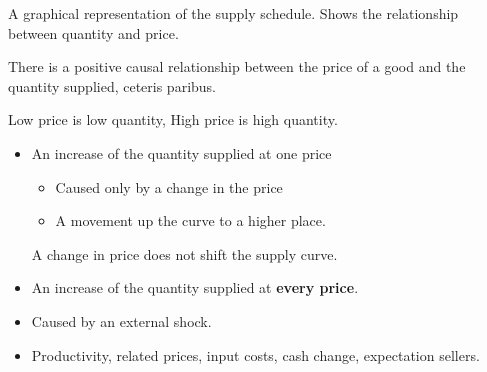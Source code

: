 \documentclass{scrreprt} %
\begin{document}
\begin{definition}
	A graphical representation of the supply schedule. Shows the relationship
	between quantity and price.
\end{definition}

\begin{definition}
	There is a positive causal relationship between the price of a good and the quantity
	supplied, ceteris paribus.

	Low price is low quantity,
	High price is high quantity.
\end{definition}

\begin{itemize}
	\item An increase of the quantity supplied at one price
	\begin{itemize}
		\item Caused only by a change in the price
	\end{itemize}

	\begin{itemize}
		\item A movement up the curve to a higher place.
	\end{itemize}

	A change in price does not shift the supply curve.
\end{itemize}

\begin{itemize}
	\item An increase of the quantity supplied at \textbf{every price}.
	\item Caused by an external shock.
	\item Productivity, related prices, input costs, cash change, expectation
	sellers.
\end{itemize}
\end{document}
